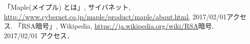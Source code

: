 \begin{thebibliography}{99}
  「Maple(メイプル) とは」, サイバネット, \url{http://www.cybernet.co.jp/maple/product/maple/about.html,} 2017/02/01アクセス.
  「RSA暗号」, Wikipedia, \url{https://ja.wikipedia.org/wiki/RSA}暗号, 2017/02/01 アクセス．\end{thebibliography}
